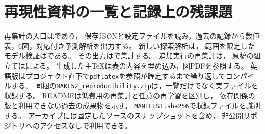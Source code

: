 \documentclass[11pt,a4paper]{ltjsarticle}
\begin{document}
\section{再現性資料の一覧と記録上の残課題}\label{app:inventory}
再集計の入口はであり，
保存JSONと設定ファイルを読み，過去の記録から数値表，6図，対応付き予測解析を出力する。
新しい探索解析は，
範囲を限定したモデル検証はである。
その出力はで集計する。
追加実行の再集計は，
原稿の組立てはによる。
生成した主TeXは表の内容を埋め込み，図PDFを参照する。
英語版はプロジェクト直下で\texttt{pdflatex}を参照が確定するまで繰り返してコンパイルする。
同梱の\texttt{MAKE52\_reproducibility.zip}は，一覧だけでなく実ファイルを収録する。
READMEは低費用の再集計と任意の再学習を区別し，
依存関係の版と利用できない過去の成果物を示す。
\texttt{MANIFEST.sha256}で収録ファイルを識別する。
アーカイブには固定したソースのスナップショットを含め，
非公開リポジトリへのアクセスなしで利用できる。
\end{document}
